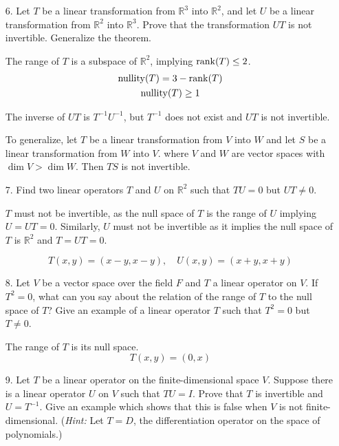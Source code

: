 \documentclass{article}
\begin{document}
\begin{enumerate}[listparindent=\parindent]
\item[6.] Let \(T\) be a linear transformation from \(\mathbb{R}^3\) into \(\mathbb{R}^2\),
    and let \(U\) be a linear transformation from \(\mathbb{R}^2\) into \(\mathbb{R}^3\).
    Prove that the transformation \(UT\) is not invertible. Generalize the theorem.

    The range of \(T\) is a subspace of \(\mathbb{R}^2\), implying \(\operatorname{rank}(T) \leq 2\).
    \begin{gather*}
        \operatorname{nullity}(T) = 3 - \operatorname{rank}(T) \\
        \operatorname{nullity}(T) \geq 1
    \end{gather*}

    The inverse of \(UT\) is \(T^{-1}U^{-1}\), but \(T^{-1}\) does not exist and \(UT\) is not invertible.

    To generalize, let \(T\) be a linear transformation from \(V\) into \(W\) and
    let \(S\) be a linear transformation from \(W\) into \(V\).
    where \(V\) and \(W\) are vector spaces with \(\dim V > \dim W\).
    Then \(TS\) is not invertible.

\item[7.] Find two linear operators \(T\) and \(U\) on \(\mathbb{R}^2\) such that \(TU = 0\) but \(UT \neq 0\).

    \(T\) must not be invertible, as the null space of \(T\) is the range of \(U\) implying \(U = UT = 0\).
    Similarly, \(U\) must not be invertible as it implies the null space of \(T\) is \(\mathbb{R}^2\) and \(T = UT = 0\).

    \[T(x, y) = (x - y, x - y), \quad U(x, y) = (x + y, x + y)\]

\item[8.] Let \(V\) be a vector space over the field \(F\) and \(T\) a linear operator on \(V\).
    If \(T^2 = 0\), what can you say about the relation of the range of \(T\) to the null space of \(T\)?
    Give an example of a linear operator \(T\) such that \(T^2 = 0\) but \(T \neq 0\).

    The range of \(T\) is its null space.
    \[ T(x, y) = (0, x) \]

\item[9.] Let \(T\) be a linear operator on the finite-dimensional space \(V\).
    Suppose there is a linear operator \(U\) on \(V\) such that \(TU = I\).
    Prove that \(T\) is invertible and \(U = T^{-1}\).
    Give an example which shows that this is false when \(V\) is not finite-dimensional.
    (\textit{Hint:} Let \(T = D\), the differentiation operator on the space of polynomials.)


\end{enumerate}
\end{document}
